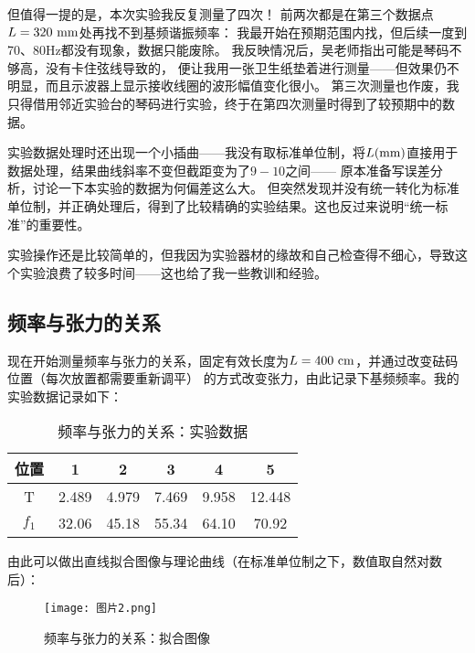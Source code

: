 \documentclass[11pt]{article}
\begin{document}
但值得一提的是，本次实验我反复测量了四次！
前两次都是在第三个数据点$L=320\,\,{\rm mm}$处再找不到基频谐振频率：
我最开始在预期范围内找，但后续一度到70、80Hz都没有现象，数据只能废除。
我反映情况后，吴老师指出可能是琴码不够高，没有卡住弦线导致的，
便让我用一张卫生纸垫着进行测量——但效果仍不明显，而且示波器上显示接收线圈的波形幅值变化很小。
第三次测量也作废，我只得借用邻近实验台的琴码进行实验，终于在第四次测量时得到了较预期中的数据。

实验数据处理时还出现一个小插曲——我没有取标准单位制，将$L(\rm mm)$直接用于数据处理，结果曲线斜率不变但截距变为了$9-10$之间——
原本准备写误差分析，讨论一下本实验的数据为何偏差这么大。
但突然发现并没有统一转化为标准单位制，并正确处理后，得到了比较精确的实验结果。这也反过来说明“统一标准”的重要性。

实验操作还是比较简单的，但我因为实验器材的缘故和自己检查得不细心，导致这个实验浪费了较多时间——这也给了我一些教训和经验。

















\subsection{频率与张力的关系}
现在开始测量频率与张力的关系，固定有效长度为$L=400\,\,{\rm cm}$，并通过改变砝码位置（每次放置都需要重新调平）
的方式改变张力，由此记录下基频频率。我的实验数据记录如下：
\begin{table}[H]
    \centering
    \caption{频率与张力的关系：实验数据}
    \begin{tabular}{cccccc}
        \toprule
        位置 & 1 & 2 & 3 & 4 & 5 \\ 
        \midrule
        T & 2.489 & 4.979 & 7.469 & 9.958 & 12.448 \\ 
        $f_1$ & 32.06 & 45.18 & 55.34 & 64.10 & 70.92 \\ 
        \bottomrule
    \end{tabular}
\end{table}
由此可以做出直线拟合图像与理论曲线（在标准单位制之下，数值取自然对数后）：
\begin{figure}[H]
    \centering
    \texttt{[image: 图片2.png]}
    \caption{频率与张力的关系：拟合图像}
\end{figure}
\end{document}
